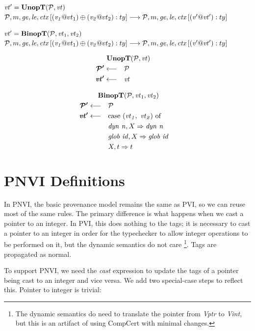 \documentclass{article}
\begin{document}
            {\(\mathit{vt}' = \mathbf{UnopT}(\mathcal{P},\mathit{vt})\)}
            {\(\mathcal{P}, m, \mathit{ge}, \mathit{le}, \mathit{ctx}\left[(\mathit{v_1} @ vt_1) \oplus (\mathit{v_2} @ vt_2) : ty\right]
              \longrightarrow
              \mathcal{P}, m, \mathit{ge}, \mathit{le}, \mathit{ctx}\left[(\mathit{v'} @ \mathit{vt}') : ty\right]\)}

            {\(\mathit{vt}' = \mathbf{BinopT}(\mathcal{P},\mathit{vt}_1,\mathit{vt}_2)\)}
            {\(\mathcal{P}, m, \mathit{ge}, \mathit{le}, \mathit{ctx}\left[(\mathit{v_1} @ vt_1) \oplus (\mathit{v_2} @ vt_2) : ty\right]
              \longrightarrow
              \mathcal{P}, m, \mathit{ge}, \mathit{le}, \mathit{ctx}\left[(\mathit{v'} @ \mathit{vt}') : ty\right]\)}

\vspace{\abovedisplayskip}
            
\begin{minipage}[t]{.49\textwidth}            
  \[\begin{aligned}
  \truledef{\unopt{\PCT}{\vt}}
  \settag{\PCT'}{\PCT}
  \settag{\vt'}{\vt}
  \end{aligned}\]
\end{minipage}
\begin{minipage}[t]{.49\textwidth}           
  \[\begin{aligned}
  \truledef{\binopt{\PCT}{\vt_1}{\vt_2}}
  \settag{\PCT'}{\PCT}
  \settag{\vt'}{\caseof{(\vt_1,~ \vt_2)}}
  \caseentry{\mathit{dyn ~ n},X}{\mathit{dyn ~ n}} \\
  \caseentry{\mathit{glob ~ id},X}{\mathit{glob ~ id}} \\
  \caseentry{X,t}{t} \\
  \end{aligned}\]
\end{minipage}

\section{PNVI Definitions}

In PNVI, the basic provenance model remains the same as PVI, so we can reuse most of the
same rules. The primary difference is what happens when we cast a pointer to an integer.
In PVI, this does nothing to the tags; it is necessary to cast a pointer to an integer
in order for the typechecker to allow integer operations to be performed on it, but
the dynamic semantics do not care \footnote{The dynamic semantics do need to translate
the pointer from {\it Vptr} to {\it Vint}, but this is an artifact of using
CompCert with minimal changes.}. Tags are propagated as normal.

To support PNVI, we need the {\it cast} expression to update the tags of a pointer
being cast to an integer and vice versa. We add two special-case steps to reflect this.
Pointer to integer is trivial:
\end{document}
